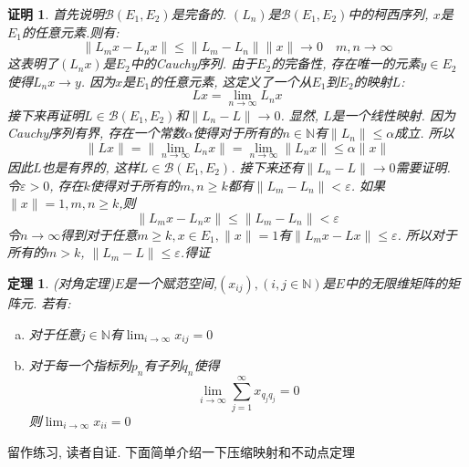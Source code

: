 \documentclass[a4paper,11pt]{article}
\theoremstyle{mystyle}
\newtheorem{theorem}{\hspace{2em}定理}[section]
\newtheorem{Proof}{\hspace{2em}证明}[section]
\begin{document}
\begin{Proof}
  首先说明$\mathcal{B}(E_1,E_2)$是完备的. $(L_n)$是$\mathcal{B}(E_1,E_2)$中的柯西序列, $x$是$E_1$的任意元素.则有:
  \begin{equation*}
    \|L_mx-L_nx\|\leq\|L_m-L_n\|\|x\|\to 0\quad m,n\to\infty
  \end{equation*}
  这表明了$(L_nx)$是$E_2$中的Cauchy序列. 由于$E_2$的完备性, 存在唯一的元素$y\in E_2$使得$L_nx\to y$. 因为$x$是$E_1$的任意元素, 这定义了一个从$E_1$到$E_2$的映射$L$:
  \begin{equation*}
    Lx=\lim_{n\to\infty}L_nx
  \end{equation*}
  接下来再证明$L\in\mathcal{B}(E_1,E_2)$和$\|L_n-L\|\to 0$.
  显然, $L$是一个线性映射. 因为Cauchy序列有界, 存在一个常数$\alpha$使得对于所有的$n\in \mathbb{N}$有$\|L_n\|\leq\alpha$成立. 所以
  \begin{equation*}
    \|Lx\|=\|\lim_{n\to\infty}L_nx\|=\lim_{n\to\infty}\|L_nx\|\leq\alpha\|x\|
  \end{equation*}
  因此$L$也是有界的, 这样$L\in\mathcal{B}(E_1,E_2)$. 接下来还有$\|L_n-L\|\to0$需要证明. 令$\varepsilon>0$, 存在$k$使得对于所有的$m,n\geq k$都有$\|L_m-L_n\|<\varepsilon$. 如果$\|x\|=1,m,n\geq k$,则
  \begin{equation*}
    \|L_mx-L_nx\|\leq\|L_m-L_n\|<\varepsilon
  \end{equation*}
  令$n\to\infty$得到对于任意$m\geq k,x\in E_1,\|x\|=1$有$\|L_mx-Lx\|\leq\varepsilon$. 所以对于所有的$m>k$, $\|L_m-L\|\leq\varepsilon$.得证
\end{Proof}
\begin{theorem}
  (对角定理)$E$是一个赋范空间,$(x_{ij}),(i,j\in \mathbb{N})$是$E$中的无限维矩阵的矩阵元. 若有:
  \begin{enumerate}[(a)]
    \item 对于任意$j\in \mathbb{N}$有$\lim_{i\to\infty}x_{ij}=0$
    \item 对于每一个指标列$p_n$有子列$q_n$使得
    \begin{equation*}
      \lim_{i\to\infty}\sum_{j=1}^{\infty}x_{q_jq_j}=0
    \end{equation*}
    则$\lim_{i\to\infty}x_{ii}=0$
  \end{enumerate}
\end{theorem}
留作练习, 读者自证. 下面简单介绍一下压缩映射和不动点定理
\end{document}
